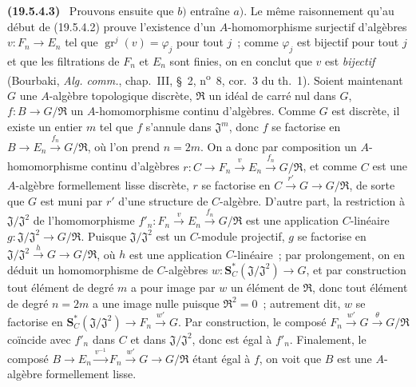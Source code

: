 \documentclass[10pt,oneside]{book}
\makeatletter
\newcommand{\gr}{\operatorname{gr}}
\newcommand{\setmanualcurrentlabel}[1]{\def\@currentlabel{#1}}
\newcommand{\oldpage}[2][]{%
  \setcounter{footnote}{0}%
  \marginpar{\scriptsize\textbf{#1}~|~#2}\ignorespaces}
\newenvironment{env}[1][]{\setmanualcurrentlabel{#1}\par\medskip\noindent\textbf{(#1)}\ }{\par}
\makeatother
\begin{document}
\begin{env}[19.5.4.3]
\label{0.19.5.4.3-fr}
\oldpage[0\textsubscript{IV-1}]{93}
Prouvons ensuite que $b)$ entraîne $a)$. Le même raisonnement qu'au début de
(19.5.4.2) prouve l'existence d'un $A$-homomorphisme surjectif d'algèbres
$v:F_n\to E_n$ tel que $\gr^j(v)=\varphi_j$ pour tout $j$~; comme $\varphi_j$
est bijectif pour tout $j$ et que les filtrations de $F_n$ et $E_n$ sont
finies, on en conclut que $v$ est \emph{bijectif} (Bourbaki,
\emph{Alg. comm.}, chap.~III, §~2, n\textsuperscript{o}~8, cor.~3 du th.~1).
Soient maintenant $G$ une $A$-algèbre topologique discrète, $\mathfrak R$ un
idéal de carré nul dans $G$, $f:B\to G/\mathfrak R$ un $A$-homomorphisme
continu d'algèbres. Comme $G$ est discrète, il existe un entier $m$ tel que
$f$ s'annule dans $\mathfrak J^m$, donc $f$ se factorise en
$B\to E_n\xrightarrow{f_n}G/\mathfrak R$, où l'on prend $n=2m$. On a donc par
composition un $A$-homomorphisme continu d'algèbres
$r:C\to F_n\xrightarrow{v}E_n\xrightarrow{f_n}G/\mathfrak R$, et comme $C$
est une $A$-algèbre formellement lisse discrète, $r$ se factorise en
$C\xrightarrow{r'}G\to G/\mathfrak R$, de sorte que $G$ est muni par $r'$ d'une
structure de $C$-algèbre. D'autre part, la restriction à
$\mathfrak J/\mathfrak J^2$ de l'homomorphisme
$f'_n:F_n\xrightarrow{v}E_n\xrightarrow{f_n}G/\mathfrak R$ est une application
$C$-linéaire $g:\mathfrak J/\mathfrak J^2\to G/\mathfrak R$. Puisque
$\mathfrak J/\mathfrak J^2$ est un $C$-module projectif, $g$ se factorise en
$\mathfrak J/\mathfrak J^2\xrightarrow{h}G\to G/\mathfrak R$, où $h$ est une
application $C$-linéaire~; par prolongement, on en déduit un homomorphisme de
$C$-algèbres $w:\mathbf S_C^*(\mathfrak J/\mathfrak J^2)\to G$, et par
construction tout élément de degré $m$ a pour image par $w$ un élément de
$\mathfrak R$, donc tout élément de degré $n=2m$ a une image nulle puisque
$\mathfrak R^2=0$~; autrement dit, $w$ se factorise en
$\mathbf S_C^*(\mathfrak J/\mathfrak J^2)\to F_n\xrightarrow{w'}G$. Par
construction, le composé $F_n\xrightarrow{w'}G\xrightarrow{\theta}G/\mathfrak R$
coïncide avec $f'_n$ dans $C$ et dans $\mathfrak J/\mathfrak J^2$, donc est
égal à $f'_n$. Finalement, le composé
$B\to E_n\xrightarrow{v^{-1}}F_n\xrightarrow{w'}G\to G/\mathfrak R$ étant
égal à $f$, on voit que $B$ est une $A$-algèbre formellement lisse.
\end{env}
\end{document}
